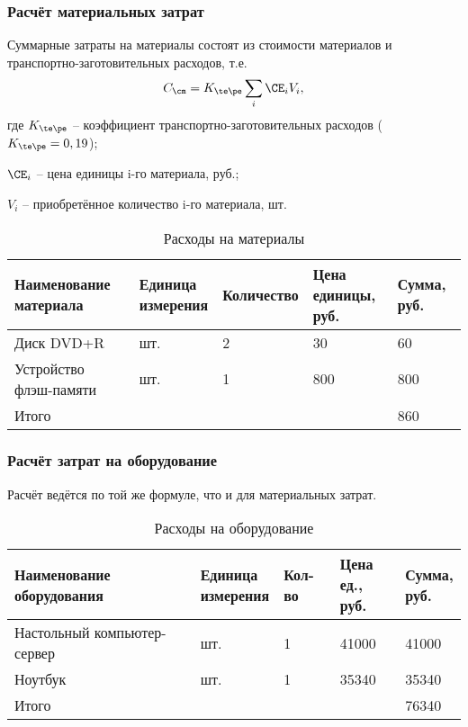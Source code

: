\subsubsection{Расчёт материальных затрат}
Суммарные затраты на материалы состоят из стоимости материалов и транспортно-заготовительных расходов, т.е. 
\begin{equation*}
    C_{\cm} = K_{\te\pe} \sum_{i} \CE_i V_i,
\end{equation*}
где $K_{\te\pe}$ -- коэффициент транспортно-заготовительных расходов ($K_{\te\pe} = 0,19$);

$\CE_i$ -- цена единицы i-го материала, руб.;

$V_i$ -- приобретённое количество i-го материала, шт.

\begin{table}[H]
    \caption{\label{tab:materials}Расходы на материалы}
    \begin{tabular}[H]{|l|l|l|l|l|}
        \hline
        \specialcell{Наименование\\материала} & \specialcell{Единица\\измерения} & Количество & \specialcell{Цена\\единицы, руб.} & Сумма, руб.\\
        \hline
        Диск DVD+R & шт. & 2 & 30 & 60\\
        \hline
        Устройство флэш-памяти & шт. & 1 & 800 & 800\\
        \hline
        Итого &  &  &  & 860\\
        \hline
    \end{tabular}
\end{table}

\subsubsection{Расчёт затрат на оборудование}

Расчёт ведётся по той же формуле, что и для материальных затрат.

\begin{table}[H]
    \caption{\label{tab:devices}Расходы на оборудование}
    \begin{tabular}[H]{|l|l|l|l|l|}
        \hline
        \specialcell{Наименование\\оборудования} & \specialcell{Единица\\измерения} & Кол-во & \specialcell{Цена\\ед., руб.} & \specialcell{Сумма,\\руб.}\\
        \hline
        Настольный компьютер-сервер & шт. & 1 & 41000 & 41000\\
        \hline
        Ноутбук & шт. & 1 & 35340 & 35340\\
        \hline
        Итого &  &  &  & 76340\\
        \hline
    \end{tabular}
\end{table}

